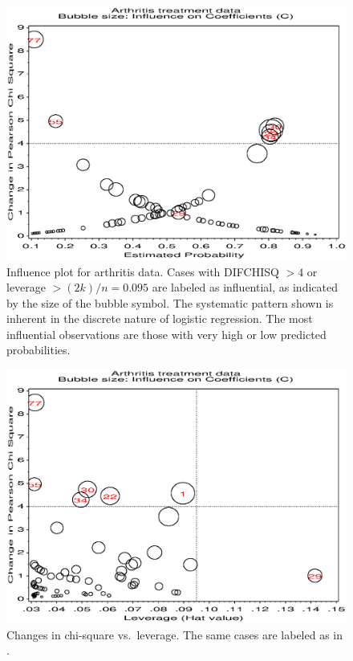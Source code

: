 \begin{figure}[!htb]
  \centering
  \includegraphics[scale=.7]{ch6/fig/logist1b1}
  \caption[Influence plot for arthritis data]{Influence plot for arthritis data.
Cases with DIFCHISQ \(> 4\) or leverage \(>  (2 k) /  n  = 0.095\) are
labeled as
influential, as indicated by the size of the bubble symbol.
The systematic pattern shown is inherent in the discrete nature of
logistic regression.  The most influential
observations are those with very high or low predicted probabilities.}\label{fig:logi1b1}
\end{figure}

\begin{figure}[!htb]
  \centering
  \includegraphics[scale=.7]{ch6/fig/logist1b2}
  \caption[Changes in chi-square vs. leverage]{Changes in chi-square vs.\ leverage.
  The same cases are labeled as in .
}\label{fig:logi1b2}
\end{figure}



